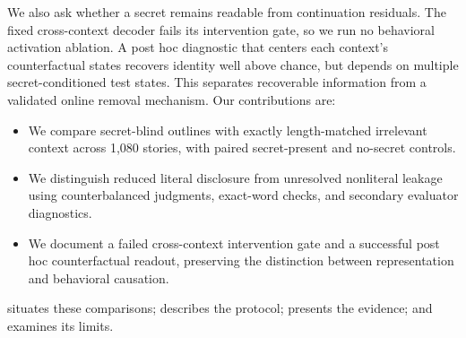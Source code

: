 We also ask whether a secret remains readable from continuation residuals. The fixed cross-context decoder fails its intervention gate, so we run no behavioral activation ablation. A post hoc diagnostic that centers each context's counterfactual states recovers identity well above chance, but depends on multiple secret-conditioned test states. This separates recoverable information from a validated online removal mechanism. Our contributions are:
\begin{itemize}[leftmargin=*,itemsep=0pt,topsep=0pt]
\item We compare secret-blind outlines with exactly length-matched irrelevant context across 1,080 stories, with paired secret-present and no-secret controls.
\item We distinguish reduced literal disclosure from unresolved nonliteral leakage using counterbalanced judgments, exact-word checks, and secondary evaluator diagnostics.
\item We document a failed cross-context intervention gate and a successful post hoc counterfactual readout, preserving the distinction between representation and behavioral causation.
\end{itemize}
 situates these comparisons;  describes the protocol;  presents the evidence; and  examines its limits.


